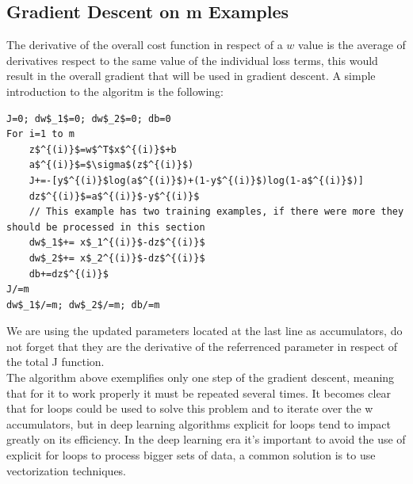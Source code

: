 \documentclass[11pt]{report}
\begin{document}
\subsection{Gradient Descent on m Examples}
The derivative of the overall cost function in respect of a $w$ value is the average of derivatives respect to the same value of the individual loss terms, this would result in the overall gradient that will be used in gradient descent. A simple introduction to the algoritm is the following:
\begin{lstlisting}[mathescape=true]
J=0; dw$_1$=0; dw$_2$=0; db=0
For i=1 to m
    z$^{(i)}$=w$^T$x$^{(i)}$+b
    a$^{(i)}$=$\sigma$(z$^{(i)}$)
    J+=-[y$^{(i)}$log(a$^{(i)}$)+(1-y$^{(i)}$)log(1-a$^{(i)}$)]
    dz$^{(i)}$=a$^{(i)}$-y$^{(i)}$
    // This example has two training examples, if there were more they should be processed in this section 
    dw$_1$+= x$_1^{(i)}$-dz$^{(i)}$
    dw$_2$+= x$_2^{(i)}$-dz$^{(i)}$
    db+=dz$^{(i)}$
J/=m
dw$_1$/=m; dw$_2$/=m; db/=m
\end{lstlisting}
We are using the updated parameters located at the last line as accumulators, do not forget that they are the derivative of the referrenced parameter in respect of the total J function.\\
The algorithm above exemplifies only one step of the gradient descent, meaning that for it to work properly it must be repeated several times. It becomes clear that for loops could be used to solve this problem and to iterate over the w accumulators, but in deep learning algorithms explicit for loops tend to impact greatly on its efficiency. In the deep learning era it's important to avoid the use of explicit for loops to process bigger sets of data, a common solution is to use vectorization techniques.
\end{document}
